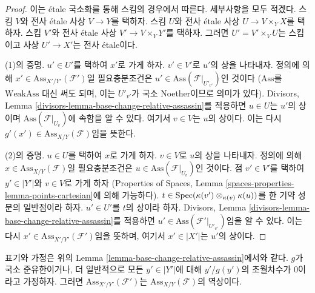 \begin{proof}
이는 \'etale 국소화를 통해 스킴의 경우에서 따른다. 세부사항을 모두 적겠다.
스킴 $V$와 전사 \'etale 사상 $V \to Y$를 택하자. 스킴 $U$와 전사
\'etale 사상 $U \to V \times_Y X$를 택하자. 스킴 $V'$와 전사
\'etale 사상 $V' \to V \times_Y Y'$를 택하자. 그러면
$U' = V' \times_V U$는 스킴이고 사상 $U' \to X'$는 전사 \'etale이다.

\medskip\noindent
(1)의 증명. $u' \in U'$를 택하여 $x'$로 가게 하자.
$v' \in V'$로 $u'$의 상을 나타내자.
정의에 의해 $x' \in \text{Ass}_{X'/Y'}(\mathcal{F}')$일 필요충분조건은
$u' \in \text{Ass}(\mathcal{F}|_{U'_{v'}})$인 것이다
($\text{Ass}$를 $\text{WeakAss}$ 대신 써도 되며, 이는 $U'_{v'}$가
국소 Noether이므로 의미가 있다). Divisors, Lemma
\ref{divisors-lemma-base-change-relative-assassin}를 적용하면
$u \in U$는 $u'$의 상이며 $\text{Ass}(\mathcal{F}|_{U_v})$에 속함을 알 수
있다. 여기서 $v \in V$는 $u$의 상이다. 이는 다시
$g'(x') \in \text{Ass}_{X/Y}(\mathcal{F})$임을 뜻한다.

\medskip\noindent
(2)의 증명. $u \in U$를 택하여 $x$로 가게 하자.
$v \in V$로 $u$의 상을 나타내자.
정의에 의해 $x \in \text{Ass}_{X/Y}(\mathcal{F})$일 필요충분조건은
$u \in \text{Ass}(\mathcal{F}|_{U_v})$인 것이다. 점
$v' \in V'$를 택하여 $y' \in |Y'|$와 $v \in V$로 가게 하자
(Properties of Spaces, Lemma
\ref{spaces-properties-lemma-points-cartesian}에 의해 가능하다).
$t \in \mathop{\mathrm{Spec}}(\kappa(v') \otimes_{\kappa(v)} \kappa(u))$를 한 기약 성분의
일반점이라 하자. $u' \in U'$를 $t$의 상이라 하자. Divisors, Lemma
\ref{divisors-lemma-base-change-relative-assassin}를 적용하면
$u' \in \text{Ass}(\mathcal{F}'|_{U'_{v'}})$임을 알 수 있다.
이는 다시 $x' \in \text{Ass}_{X'/Y'}(\mathcal{F}')$임을 뜻하며,
여기서 $x' \in |X'|$는 $u'$의 상이다.
\end{proof}

\begin{lemma}
\label{lemma-base-change-relative-assassin-quasi-finite}
표기와 가정은 위의 Lemma
\ref{lemma-base-change-relative-assassin}에서와 같다.
$g$가 국소 준유한이거나, 더 일반적으로 모든 $y' \in |Y'|$에 대해
$y'/g(y')$의 초월차수가 $0$이라고 가정하자. 그러면
$\text{Ass}_{X'/Y'}(\mathcal{F}')$는
$\text{Ass}_{X/Y}(\mathcal{F})$의 역상이다.
\end{lemma}


